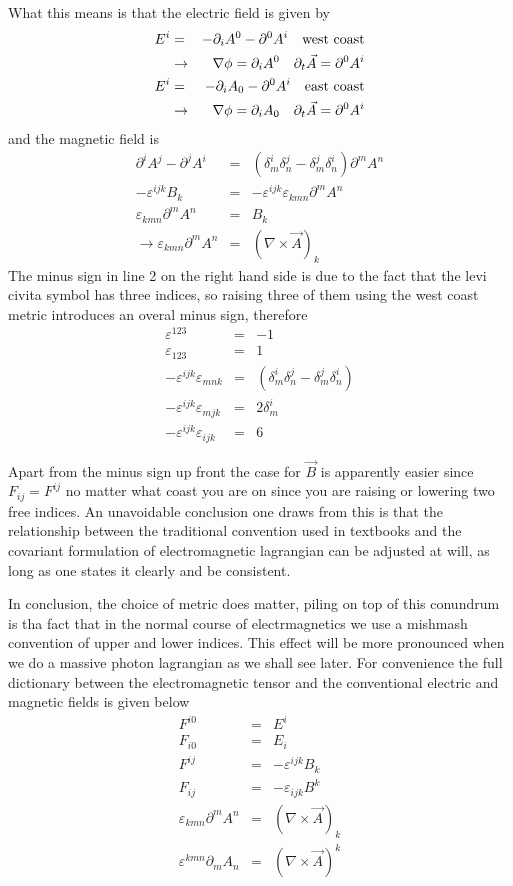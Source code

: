 \documentclass[aps,preprint,preprintnumbers,nofootinbib,showpacs,prd]{revtex4-1}
\newcommand{\nbea}{\begin{eqnarray*}}
\newcommand{\neea}{\end{eqnarray*}}
\begin{document}
What this means is that the electric field is given by
%
\nbea
E^i & = & -\partial_i A^0 - \partial^0 A^i ~~~{\rm west~coast} \\
& \to & \nabla \phi = \partial_i A^0 ~~~ \partial_t \vec A = \partial^0 A^i \\
E^i & = & -\partial_i A_0 - \partial^0 A^i ~~~{\rm east~coast} \\
& \to & \nabla \phi = \partial_i A_0 ~~~ \partial_t \vec A = \partial^0 A^i
\neea
%
and the magnetic field is
%
\nbea
\partial^i A^j - \partial^j A^i  & = & (\delta^i_m \delta^j_n - \delta^j_m \delta^i_n) \partial^m A^n \\
-\varepsilon^{ijk} B_k & = & -\varepsilon^{ijk} \varepsilon_{kmn} \partial^m A^n \\
\varepsilon_{kmn} \partial^m A^n & = & B_k \\
\to \varepsilon_{kmn} \partial^m A^n  & = & (\nabla \times \vec A )_k
\neea
%
The minus sign in line 2 on the right hand side is due to the fact that the levi civita symbol has three indices, so raising three of them using the west coast metric introduces an overal minus sign, therefore
%
\nbea
\varepsilon^{123} & = & - 1\\
\varepsilon_{123} & = & 1 \\
-\varepsilon^{ijk} \varepsilon_{mnk} & = & (\delta^i_m \delta^j_n - \delta^j_m \delta^i_n) \\
-\varepsilon^{ijk} \varepsilon_{mjk} & = & 2\delta^i_m \\
-\varepsilon^{ijk} \varepsilon_{ijk} & = & 6
\neea
%


Apart from the minus sign up front the case for $\vec B$ is apparently easier since $F_{ij} = F^{ij}$ no matter what coast you are on since you are raising or lowering two free indices. An unavoidable conclusion one draws from this is that the relationship between the traditional convention used in textbooks and the covariant formulation of electromagnetic lagrangian can be adjusted at will, as long as one states it clearly and be consistent.

In conclusion, the choice of metric does matter, piling on top of this conundrum is tha fact that in the normal course of electrmagnetics we use a mishmash convention of upper and lower indices. This effect will be more pronounced when we do a massive photon lagrangian as we shall see later. For convenience the full dictionary between the electromagnetic tensor and the conventional electric and magnetic fields is given below
%
\nbea
F^{i0} & = & E^i \\
F_{i0} & = & E_i \\
F^{ij} & = & -\varepsilon^{ijk} B_k \\
F_{ij} & = & -\varepsilon_{ijk} B^k \\
\varepsilon_{kmn} \partial^m A^n  & = & (\nabla \times \vec A )_k \\
\varepsilon^{kmn} \partial_m A_n  & = & (\nabla \times \vec A )^k
\neea
%
\end{document}
